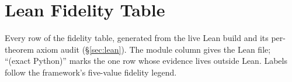 \section{Lean Fidelity Table}
\label{app:lean}

Every row of the fidelity table, generated from the live Lean build and its per-theorem axiom
audit (\S\ref{sec:lean}). The module column gives the Lean file; ``(exact Python)'' marks the one
row whose evidence lives outside Lean. Labels follow the framework's five-value fidelity legend.

{\small

}
